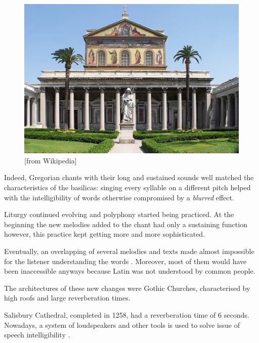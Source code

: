 \documentclass[a4paper]{article}
\begin{document}
\begin{figure}[H]
\centering
\begin{tcolorbox}
\includegraphics[scale=0.16]{san-paolo}
\caption{[from Wikipedia]}
\label{fig:san-paolo}
\end{tcolorbox}\par\bigskip
\end{figure}

Indeed, Gregorian chants with their long and sustained sounds well matched the characteristics of the basilicas: singing every syllable on a different pitch helped with the intelligibility of words otherwise compromised by a \textit{blurred} effect.

Liturgy continued evolving and polyphony started being practiced. At the beginning the new melodies added to the chant had only a sustaining function however, this practice kept getting more and more sophisticated. 

Eventually, an overlapping of several melodies and texts made almost impossible for the listener understanding the words \cite{article:acoustic:churches} \cite{book:history_music}. Moreover, most of them would have been inaccessible anyways because Latin was not understood by common people.

The architectures of these new changes were Gothic Churches, characterised by high roofs and large reverberation times.

Salisbury Cathedral, completed in 1258, had a reverberation time of 6 seconds. Nowadays, a system of loudspeakers and other tools is used to solve issue of speech intelligibility \cite{site:salisbury:reverberation}.
\end{document}
